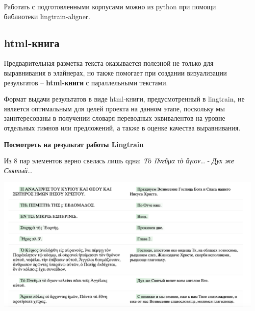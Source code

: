 \documentclass[
  letterpaper,
]{book}
\begin{document}
Работать с подготовленными корпусами можно из python при помощи
библиотеки lingtrain-aligner.

\hypertarget{html-ux43aux43dux438ux433ux430}{%
\subsection{html-книга}\label{html-ux43aux43dux438ux433ux430}}

Предварительная разметка текста оказывается полезной не только для
выравнивания в элайнерах, но также помогает при создании визуализации
результатов -- \textbf{html-книги} с параллельными текстами.

Формат выдачи результатов в виде html-книги, предусмотренный в
lingtrain, не является оптимальным для целей проекта на данном этапе,
поскольку мы заинтересованы в получении словаря переводных эквивалентов
на уровне отдельных гимнов или предложений, а также в оценке качества
выравнивания.

\begin{tcolorbox}[enhanced jigsaw, breakable, arc=.35mm, colframe=quarto-callout-caution-color-frame, leftrule=.75mm, bottomrule=.15mm, rightrule=.15mm, toprule=.15mm, opacityback=0, left=2mm, colback=white]

\textbf{Посмотреть на результат работы Lingtrain}\vspace{2mm}

Из 8 пар элементов верно свелась лишь одна: \emph{Τὸ Πνεῦμα τὸ
ἄγιον\ldots{}} - \emph{Дух же Святый\ldots{}}

\includegraphics{images/lingtrain_faulty_result.png}

\end{tcolorbox}
\end{document}
